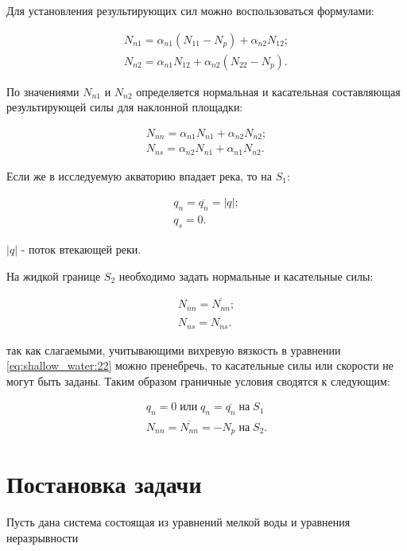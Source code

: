\documentclass[14pt]{extreport}
\begin{document}
Для установления результирующих сил можно воспользоваться формулами:

\begin{eqnarray}
N_{n1}=\alpha_{n1}(N_{11}-N_{p})+\alpha_{n2}N_{12}; \nonumber\\
N_{n2}=\alpha_{n1}N_{12}+\alpha_{n2}(N_{22}-N_{p}).
\end{eqnarray}

По значениями $N_{n1}$ и $N_{n2}$ определяется нормальная и касательная составляющая результирующей силы для наклонной площадки:

\begin{eqnarray}
N_{nn}=\alpha_{n1}N_{n1}+\alpha_{n2}N_{n2}; \nonumber\\
N_{ns}=\alpha_{n2}N_{n1}+\alpha_{n1}N_{n2}.
\end{eqnarray}

Если же в исследуемую акваторию впадает река, то на $ S_1 $:

\begin{eqnarray}
q_n=\overline{q_n}=|q|; \nonumber\\
q_s=0.
\end{eqnarray}

 $|q|$ - поток втекающей
реки. 

На жидкой границе $ S_2 $ необходимо задать нормальные и касательные силы:

\begin{eqnarray}
N_{nn}=\overline{N_{nn}}; \nonumber\\
N_{ns}=\overline{N_{ns}}.
\end{eqnarray}

 так как слагаемыми, учитывающими вихревую вязкость в уравнении \ref{eq:shallow_water:22} можно пренебречь, то касательные силы или скорости не могут быть заданы. Таким образом граничные условия сводятся к следующим:

\begin{eqnarray}
q_n=0 \; \text{или} \; q_n=\overline{q_n} \; \text{на} \; S_1\nonumber\\
N_{nn}=\overline{N_{nn}}=-N_p \; \text{на} \; S_2.
\end{eqnarray}

\chapter{Постановка задачи}

Пусть дана система состоящая из уравнений мелкой воды и уравнения неразрывности
\end{document}
